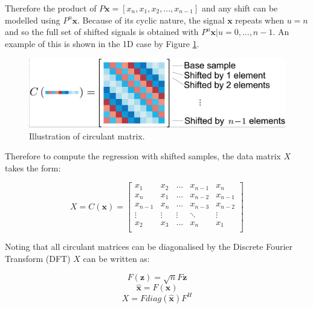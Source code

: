 \documentclass[11pt,twoside]{report}
\begin{document}
Therefore the product of $P\mathbf{x} = [x_{n},x_{1},x_{2},...,x_{n-1}]$ and any shift can be modelled using $P^{u}\mathbf{x}$. Because of its cyclic nature, the signal $\mathbf{x}$ repeats when $u=n$ and so the full set of shifted signals is obtained with ${P^{u}\mathbf{x} | u=0,...,n-1}$. An example of this is shown in the 1D case by Figure \ref{circular_data}.

\noindent \begin{figure}[h!]
	\includegraphics[width = 1.0\hsize]{figures/circular_shift.png}
	\caption{Illustration of circulant matrix.\cite{kcf}}
	\label{circular_data}
\end{figure}

Therefore to compute the regression with shifted samples, the data matrix $X$ takes the form:

\begin{equation}
X = C(\mathbf{x}) = 
\begin{bmatrix}
x_{1} & x_{2} & \dots & x_{n-1} & x_{n} \\
x_{n} & x_{1} & \dots & x_{n-2}  & x_{n-1}  \\
x_{n-1} & x_{n} & \dots & x_{n-3} & x_{n-2}  \\
\vdots & \vdots & \vdots & \ddots & \vdots \\
x_{2}  & x_{3}  & \dots & x_{n} & x_{1} \\
\end{bmatrix}
\end{equation}

Noting that all circulant matrices can be diagonalised by the Discrete Fourier Transform (DFT) $X$ can be written as:


\begin{equation}
\mathit{F}(\mathbf{z}) = \sqrt{n}F\mathbf{z}
\end{equation}
\begin{equation}
\hat{\mathbf{x}} = \mathit{F}(\mathbf{x})
\end{equation}
\begin{equation}
X = F diag(\hat{\mathbf{x}}) F^{H}
\end{equation}
\end{document}
